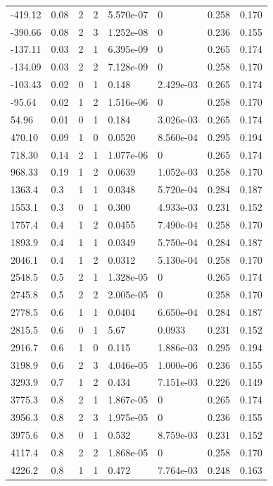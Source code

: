 \documentclass[preview]{standalone}
\begin{document}
{{\begin{tabular}{L{1.2cm}C{1.2cm} C{0.3cm}C{0.5cm} C{1.4cm}C{1.4cm} C{1.4cm}C{1.4cm}}
  -419.12  &  0.08  & 2     &  2 &  5.570e-07  & 0  & 0.258 &  0.170   \\ 
  -390.66  &  0.08  & 2     &  3 &  1.252e-08  & 0  & 0.236 &  0.155   \\ 
  -137.11  &  0.03  & 2     &  1 &  6.395e-09  & 0  & 0.265 &  0.174   \\ 
  -134.09  &  0.03  & 2     &  2 &  7.128e-09  & 0  & 0.258 &  0.170   \\ 
  -103.43  &  0.02  & 0     &  1 &  0.148  & 2.429e-03  & 0.265 &  0.174   \\ 
  -95.64  &  0.02  & 1     &  2 &  1.516e-06  & 0  & 0.258 &  0.170   \\ 
  54.96  &  0.01  & 0     &  1 &  0.184  & 3.026e-03  & 0.265 &  0.174   \\ 
  470.10  &  0.09  & 1     &  0 &  0.0520  & 8.560e-04  & 0.295 &  0.194   \\ 
  718.30  &  0.14  & 2     &  1 &  1.077e-06  & 0  & 0.265 &  0.174   \\ 
  968.33  &  0.19  & 1     &  2 &  0.0639  & 1.052e-03  & 0.258 &  0.170   \\ 
  1363.4  &   0.3  & 1     &  1 &  0.0348  & 5.720e-04  & 0.284 &  0.187   \\ 
  1553.1  &   0.3  & 0     &  1 &  0.300  & 4.933e-03  & 0.231 &  0.152   \\ 
  1757.4  &   0.4  & 1     &  2 &  0.0455  & 7.490e-04  & 0.258 &  0.170   \\ 
  1893.9  &   0.4  & 1     &  1 &  0.0349  & 5.750e-04  & 0.284 &  0.187   \\ 
  2046.1  &   0.4  & 1     &  2 &  0.0312  & 5.130e-04  & 0.258 &  0.170   \\ 
  2548.5  &   0.5  & 2     &  1 &  1.328e-05  & 0  & 0.265 &  0.174   \\ 
  2745.8  &   0.5  & 2     &  2 &  2.005e-05  & 0  & 0.258 &  0.170   \\ 
  2778.5  &   0.6  & 1     &  1 &  0.0404  & 6.650e-04  & 0.284 &  0.187   \\ 
  2815.5  &   0.6  & 0     &  1 &  5.67  & 0.0933  & 0.231 &  0.152   \\ 
  2916.7  &   0.6  & 1     &  0 &  0.115  & 1.886e-03  & 0.295 &  0.194   \\ 
  3198.9  &   0.6  & 2     &  3 &  4.046e-05  & 1.000e-06  & 0.236 &  0.155   \\ 
  3293.9  &   0.7  & 1     &  2 &  0.434  & 7.151e-03  & 0.226 &  0.149   \\ 
  3775.3  &   0.8  & 2     &  1 &  1.867e-05  & 0  & 0.265 &  0.174   \\ 
  3956.3  &   0.8  & 2     &  3 &  1.975e-05  & 0  & 0.236 &  0.155   \\ 
  3975.6  &   0.8  & 0     &  1 &  0.532  & 8.759e-03  & 0.231 &  0.152   \\ 
  4117.4  &   0.8  & 2     &  2 &  1.868e-05  & 0  & 0.258 &  0.170   \\ 
  4226.2  &   0.8  & 1     &  1 &  0.472  & 7.764e-03  & 0.248 &  0.163   \\ 
\hline 
\end{tabular} 

}}
\end{document}
